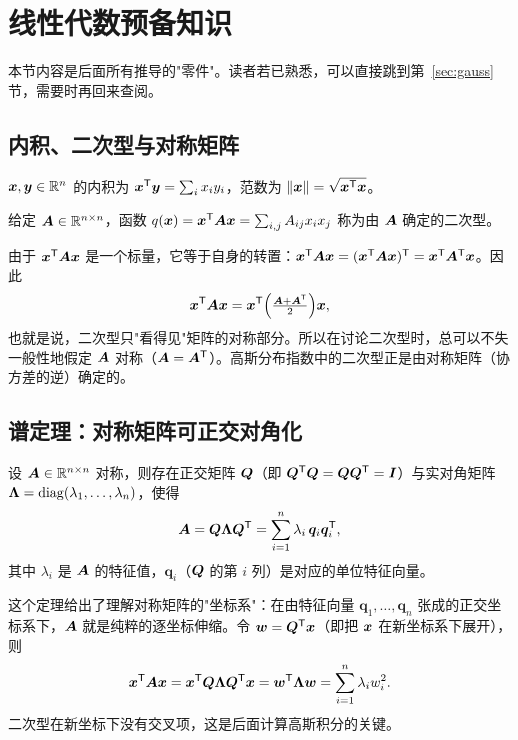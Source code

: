 \section{线性代数预备知识}\label{sec:la}

本节内容是后面所有推导的"零件"。读者若已熟悉，可以直接跳到第~\ref{sec:gauss} 节，需要时再回来查阅。

\subsection{内积、二次型与对称矩阵}

\begin{definition}[内积与范数]
$\bm{x},\bm{y}\in\mathbb{R}^n$ 的内积为 $\bm{x}^{\mathsf{T}}\bm{y}=\sum_{i}x_iy_i$，范数为 $\|\bm{x}\|=\sqrt{\bm{x}^{\mathsf{T}}\bm{x}}$。
\end{definition}

\begin{definition}[二次型]
给定 $\bm{A}\in\mathbb{R}^{n\times n}$，函数 $q(\bm{x})=\bm{x}^{\mathsf{T}}\bm{A}\bm{x}=\sum_{i,j}A_{ij}x_ix_j$ 称为由 $\bm{A}$ 确定的二次型。
\end{definition}

由于 $\bm{x}^{\mathsf{T}}\bm{A}\bm{x}$ 是一个标量，它等于自身的转置：$\bm{x}^{\mathsf{T}}\bm{A}\bm{x}=(\bm{x}^{\mathsf{T}}\bm{A}\bm{x})^{\mathsf{T}}=\bm{x}^{\mathsf{T}}\bm{A}^{\mathsf{T}}\bm{x}$。因此
\[
\bm{x}^{\mathsf{T}}\bm{A}\bm{x}=\bm{x}^{\mathsf{T}}\Big(\tfrac{\bm{A}+\bm{A}^{\mathsf{T}}}{2}\Big)\bm{x} ,
\]
也就是说，二次型只"看得见"矩阵的对称部分。所以在讨论二次型时，总可以不失一般性地假定 $\bm{A}$ 对称（$\bm{A}=\bm{A}^{\mathsf{T}}$）。高斯分布指数中的二次型正是由对称矩阵（协方差的逆）确定的。

\subsection{谱定理：对称矩阵可正交对角化}

\begin{theorem}[谱定理]\label{thm:spectral}
设 $\bm{A}\in\mathbb{R}^{n\times n}$ 对称，则存在正交矩阵 $\bm{Q}$（即 $\bm{Q}^{\mathsf{T}}\bm{Q}=\bm{Q}\bm{Q}^{\mathsf{T}}=\bm{I}$）与实对角矩阵 $\bm{\Lambda}=\operatorname{diag}(\lambda_1,\dots,\lambda_n)$，使得
\[
\bm{A}=\bm{Q}\bm{\Lambda}\bm{Q}^{\mathsf{T}}=\sum_{i=1}^n \lambda_i\,\bm{q}_i\bm{q}_i^{\mathsf{T}} ,
\]
其中 $\lambda_i$ 是 $\bm{A}$ 的特征值，$\bm{q}_i$（$\bm{Q}$ 的第 $i$ 列）是对应的单位特征向量。
\end{theorem}

这个定理给出了理解对称矩阵的"坐标系"：在由特征向量 $\bm{q}_1,\dots,\bm{q}_n$ 张成的正交坐标系下，$\bm{A}$ 就是纯粹的逐坐标伸缩。令 $\bm{w}=\bm{Q}^{\mathsf{T}}\bm{x}$（即把 $\bm{x}$ 在新坐标系下展开），则
\begin{equation}\label{eq:quad-diag}
\bm{x}^{\mathsf{T}}\bm{A}\bm{x}=\bm{x}^{\mathsf{T}}\bm{Q}\bm{\Lambda}\bm{Q}^{\mathsf{T}}\bm{x}=\bm{w}^{\mathsf{T}}\bm{\Lambda}\bm{w}=\sum_{i=1}^n\lambda_i w_i^2 .
\end{equation}
二次型在新坐标下没有交叉项，这是后面计算高斯积分的关键。

